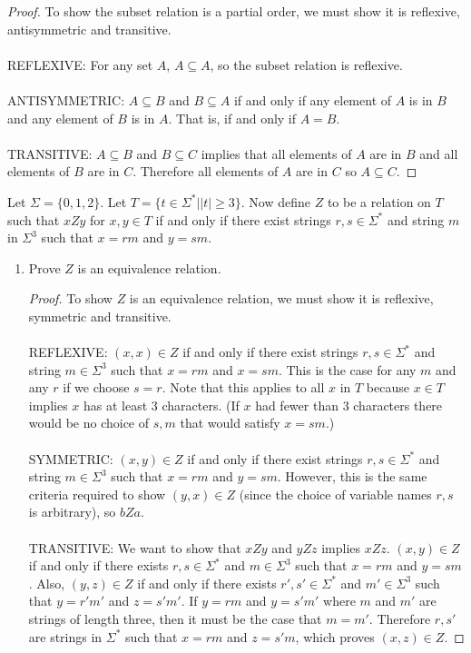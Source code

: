 \documentclass[]{exam}
\begin{document}
\begin{questions}
\begin{solution}
\begin{proof}
To show the subset relation is a partial order, we must show it is reflexive, 
antisymmetric and transitive.
\\~\\
REFLEXIVE: For any set $A$, $A \subseteq A$, so the subset relation is
reflexive.
\\~\\
ANTISYMMETRIC: $A \subseteq B$ and $B \subseteq A$ if and only if any element
of $A$ is in $B$ and any element of $B$ is in $A$. That is, if and only if 
$A = B$. 
\\~\\
TRANSITIVE: $A \subseteq B$ and $B \subseteq C$ implies that all elements of $A$
are in $B$ and all elements of $B$ are in $C$. Therefore all elements of $A$ are
in $C$ so $A \subseteq C$.
\end{proof}
\end{solution}

\question 
Let $\Sigma = \{0,1,2\}$.  Let $T = \{t \in \Sigma^* | |t| \geq 3\}$.
Now define $Z$ to be a relation on $T$ such that $xZy$ for $x,y \in
T$ if and only if there exist strings $r,s \in \Sigma^*$
and string $m$ in $\Sigma^3$ such that $x = rm$ and $y = sm$. 

\begin{enumerate}[label=\alph*)]
\item Prove $Z$ is an equivalence relation.
\begin{solution}
\begin{proof}
To show $Z$ is an equivalence relation, we must show it is reflexive, symmetric
and transitive.
\\~\\
REFLEXIVE: $(x,x) \in Z$ if and only if there exist strings $r,s \in \Sigma^*$ and
string $m \in \Sigma^3$ such that $x = rm$ and $x = sm$. This is the case
for any $m$ and any $r$ if we choose $s = r$. Note that this applies to
all $x$ in $T$ because $x \in T$ implies $x$ has at least $3$ characters. (If
$x$ had fewer than $3$ characters there would be no choice of $s,m$ that would
satisfy $x = sm$.)
\\~\\
SYMMETRIC: $(x,y) \in Z$ if and only if there exist strings $r,s \in \Sigma^*$ and
string $m \in \Sigma^3$ such that $x = rm$ and $y = sm$. However, this is
the same criteria required to show $(y,x) \in Z$ (since the choice of variable
names $r,s$ is arbitrary), so $bZa$.
\\~\\
TRANSITIVE: We want to show that $xZy$ and $yZz$ implies $xZz$. $(x,y) \in Z$
if and only if there exists $r,s \in \Sigma^*$ and $m \in \Sigma^3$ such 
that $x = rm$ and $y = sm$.  Also, $(y,z) \in Z$ if and only if there 
exists $r',s' \in \Sigma^*$ 
and $m' \in \Sigma^3$ such that $y = r'm'$ and $z = s'm'$. If $y = rm$
and $y = s'm'$ where $m$ and $m'$ are strings of length three, then
it must be the case that $m = m'$. Therefore $r, s'$ are strings in
$\Sigma^*$ such that $x = rm$ and $z = s'm$, which proves $(x,z) \in Z$.
\end{proof}
\end{solution}


\end{enumerate}
\end{questions}
\end{document}
